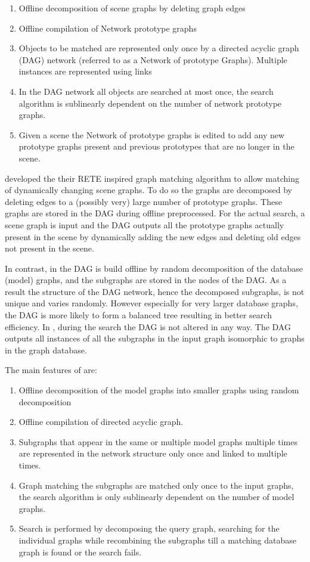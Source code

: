 \begin{enumerate}
\item Offline decomposition of scene graphs by deleting graph edges
\item Offline compilation of Network prototype graphs
\item Objects to be matched are represented only once by a directed acyclic graph (DAG) network (referred to as a Network of prototype Graphs). Multiple instances are represented using links
\item In the DAG network  all objects are searched at most  once, the search algorithm is sublinearly dependent on the number of network prototype graphs.
\item Given a scene the Network of prototype graphs is edited to add any new prototype graphs present and previous prototypes that are no longer in the scene.
\end{enumerate}
 
\cite{bunke_glauser_tran1991} developed the their RETE inspired graph matching algorithm to allow matching of dynamically changing scene graphs. To do so the graphs are decomposed by deleting edges to a (possibly very) large number of prototype graphs. These graphs are stored in the DAG during offline preprocessed. For the actual search, a scene graph is input and the DAG outputs all the prototype graphs actually present in the scene by dynamically  adding the new edges and deleting old edges not present in the scene.

In contrast, in \cite{messmer_bunke2000} the DAG is build offline by  random decomposition of the database (model) graphs, and the subgraphs are stored in the nodes of the DAG. As a result the structure of the DAG network, hence the decomposed subgraphs, is not unique and varies randomly. However especially for very larger database graphs, the DAG is more likely to form a balanced tree resulting in better search efficiency. In \cite{bunke_glauser_tran1991}, during the search the DAG is not altered in any way. The DAG outputs all instances of all the subgraphs in the input graph isomorphic to graphs in the graph database.  

The main features of \cite{bunke_glauser_tran1991} are:

\begin{enumerate}
\item Offline decomposition of the model graphs into smaller graphs using random decomposition
\item Offline compilation of directed acyclic graph.
\item Subgraphs that appear in the same or multiple model graphs multiple times are represented in the network structure only once and linked to multiple times.
\item Graph matching the subgraphs are matched only once to the input graphs, the search algorithm is only sublinearly dependent on the number of model graphs.
\item Search is performed by decomposing the query graph, searching for the individual graphs while recombining the subgraphs till a matching database graph is found or the search fails.
\end{enumerate}


